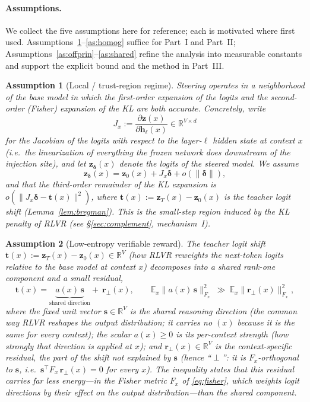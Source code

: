 \documentclass[11pt]{article}
\newtheorem{assumption}{Assumption}[section]
\newcommand{\R}{\mathbb{R}}
\newcommand{\E}{\mathbb{E}}
\newcommand{\bh}{\mathbf{h}}
\newcommand{\bz}{\mathbf{z}}
\newcommand{\bt}{\mathbf{t}}
\newcommand{\bs}{\mathbf{s}}
\newcommand{\br}{\mathbf{r}}
\newcommand{\bdelta}{\bm{\delta}}
\begin{document}
\paragraph{Assumptions.} We collect the five assumptions here for reference; each is motivated where
first used. Assumptions~\ref{as:local}--\ref{as:homog} suffice for Part~I and
Part~II; Assumptions~\ref{as:offprin}--\ref{as:shared} refine the analysis into
measurable constants and support the explicit bound and the method in Part~III.

\begin{assumption}[Local / trust-region regime]\label{as:local}
Steering operates in a neighborhood of the base model in which the first-order expansion of the
logits and the second-order (Fisher) expansion of the KL are both accurate. Concretely, write
\begin{equation*}
J_x:=\frac{\partial\bz(x)}{\partial\bh_\ell(x)}\in\R^{V\times d}
\end{equation*}
for the Jacobian of the logits with respect to the layer-$\ell$ hidden state at context $x$
(i.e.\ the linearization of everything the frozen network does downstream of the injection site),
and let $\bz_{\bdelta}(x)$ denote the logits of the steered model. We assume
\begin{equation*}
\bz_{\bdelta}(x)=\bz_0(x)+J_x\bdelta+o(\|\bdelta\|),
\end{equation*}
and that the third-order remainder of the KL expansion is $o(\|J_x\bdelta-\bt(x)\|^2)$, where
$\bt(x):=\bz_T(x)-\bz_0(x)$ is the teacher logit shift (Lemma~\ref{lem:bregman}). This is the
small-step region induced by the KL penalty of RLVR (see \S\ref{sec:complement}, mechanism~I).
\end{assumption}

\begin{assumption}[Low-entropy verifiable reward]\label{as:reward}
The teacher logit shift $\bt(x):=\bz_T(x)-\bz_0(x)\in\R^{V}$ (how RLVR reweights the next-token
logits relative to the base model at context $x$) decomposes into a shared rank-one component and a
small residual,
\begin{equation*}
\bt(x)=\underbrace{a(x)\,\bs}_{\text{shared direction}}+\ \br_\perp(x),
\qquad
\E_x\|a(x)\,\bs\|_{F_x}^2\ \gg\ \E_x\|\br_\perp(x)\|_{F_x}^2 ,
\end{equation*}
where the fixed unit vector $\bs\in\R^{V}$ is the \emph{shared reasoning direction} (the common way
RLVR reshapes the output distribution; it carries no $(x)$ because it is the same for every
context); the scalar $a(x)\ge0$ is its \emph{per-context strength} (how strongly that direction is
applied at $x$); and $\br_\perp(x)\in\R^{V}$ is the \emph{context-specific residual}, the part of
the shift not explained by $\bs$ (hence ``$\perp$'': it is $F_x$-orthogonal to $\bs$, i.e.\
$\bs^\top F_x\,\br_\perp(x)=0$ for every $x$). The inequality states that this residual carries far
less energy---in the Fisher metric $F_x$ of \eqref{eq:fisher}, which weights logit directions by
their effect on the output distribution---than the shared component.
\end{assumption}
\end{document}
